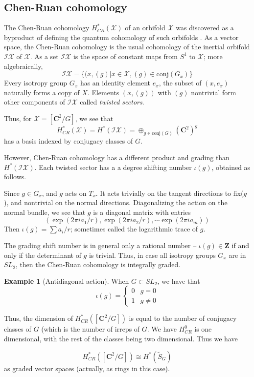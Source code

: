 \documentclass{amsart}[12pt]
\theoremstyle{definition}
\newtheorem{example}[dummy]{Example}
\newcommand{\Z}{\mathbf{Z}}
\newcommand{\C}{\mathbf{C}}
\begin{document}
\subsection{Chen-Ruan cohomology}

The Chen-Ruan cohomology $H_{CR}^*(\mathcal{X})$ of an orbifold $\mathcal{X}$ was discovered as a byproduct of defining the quantum cohomology of such orbifolds \cite{chenruancohomology}.  As a vector space, the Chen-Ruan cohomology is the usual cohomology of the inertial orbifold $\mathcal{IX}$ of $\mathcal{X}$.  As a set $\mathcal{IX}$ is the space of constant maps from $S^1$ to $\mathcal{X}$; more algebraically, 
$$\mathcal{IX}=\{(x, (g)| x\in \mathcal{X}, (g)\in\textrm{conj}(G_x)\}$$
Every isotropy group $G_x$ has an identity element $e_x$, the subset of $(x, e_x)$ naturally forms a copy of $X$.  Elements $(x,(g))$ with $(g)$ nontrivial form other components of $\mathcal{IX}$ called \emph{twisted sectors}.

Thus, for $\mathcal{X}=[\C^2/G]$, we see that 
$$H_{CR}^*(\mathcal{X}) =H^*(\mathcal{IX})=\oplus_{g\in\textrm{conj}(G)} (\C^2)^g$$
has a basis indexed by conjugacy classes of $G$.

However, Chen-Ruan cohomology has a different product and grading than $H^*(\mathcal{IX})$.  Each twisted sector has a a degree shifting number $\iota(g)$, obtained as follows.

Since $g\in G_x$, and $g$ acts on $T_x$.  It acts trivially on the tangent directions to fix($g$), and nontrivial on the normal directions.  Diagonalizing the action on the normal bundle, we see that $g$ is a diagonal matrix with entries 
$$(\exp(2\pi i a_1/r), \exp(2\pi i a_2/r), \cdots \exp(2\pi i a_m))$$
Then $\iota(g)=\sum a_i/r$; sometimes called the logarithmic trace of $g$.

The grading shift number is in general only a rational number -- $\iota(g)\in \Z$ if and only if the determinant of $g$ is trivial.  Thus, in case all isotropy groups $G_x$ are in $SL_2$, then the Chen-Ruan cohomology is integrally graded.

\begin{example}[Antidiagonal action]
When $G\subset SL_2$, we have that 
$$\iota(g)=\left\{\begin{array}{rl} 0 & g=0 \\
1 & g\neq 0 \end{array}\right.
$$

Thus, the dimension of $H_{CR}^*([\C^2/G])$ is equal to the number of conjugacy classes of $G$ (which is the number of irreps of $G$.  We have $H_{CR}^0$ is one dimensional, with the rest of the classes being two dimensional.  Thus we have

$$H_{CR}^*([\C^2/G])\cong H^*(\widetilde{S}_G)$$
as graded vector spaces (actually, as rings in this case).  
\end{example}
\end{document}

